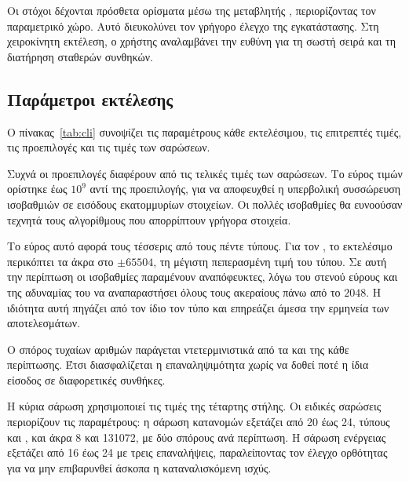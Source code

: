 Οι στόχοι δέχονται πρόσθετα ορίσματα μέσω της μεταβλητής ,
περιορίζοντας τον παραμετρικό χώρο. Αυτό διευκολύνει τον γρήγορο έλεγχο της
εγκατάστασης. Στη χειροκίνητη εκτέλεση, ο χρήστης αναλαμβάνει την ευθύνη για τη
σωστή σειρά και τη διατήρηση σταθερών συνθηκών.

\subsection{Παράμετροι εκτέλεσης}
\label{sec:repro-cli}

Ο πίνακας~\ref{tab:cli} συνοψίζει τις παραμέτρους κάθε εκτελέσιμου, τις
επιτρεπτές τιμές, τις προεπιλογές και τις τιμές των σαρώσεων.

Συχνά οι προεπιλογές διαφέρουν από τις τελικές τιμές των σαρώσεων. Το εύρος
τιμών ορίστηκε έως $10^9$ αντί της προεπιλογής, για να αποφευχθεί η υπερβολική
συσσώρευση ισοβαθμιών σε εισόδους εκατομμυρίων στοιχείων. Οι πολλές ισοβαθμίες
θα ευνοούσαν τεχνητά τους αλγορίθμους που απορρίπτουν γρήγορα στοιχεία.

Το εύρος αυτό αφορά τους τέσσερις από τους πέντε τύπους. Για τον , το
εκτελέσιμο περικόπτει τα άκρα στο $\pm 65504$, τη μέγιστη πεπερασμένη τιμή του
τύπου. Σε αυτή την περίπτωση οι ισοβαθμίες παραμένουν αναπόφευκτες, λόγω του
στενού εύρους και της αδυναμίας του  να αναπαραστήσει όλους τους
ακεραίους πάνω από το $2048$. Η ιδιότητα αυτή πηγάζει από τον ίδιο τον τύπο και
επηρεάζει άμεσα την ερμηνεία των αποτελεσμάτων.

Ο σπόρος τυχαίων αριθμών παράγεται ντετερμινιστικά από τα  και  της
κάθε περίπτωσης. Έτσι διασφαλίζεται η επαναληψιμότητα χωρίς να δοθεί ποτέ η
ίδια είσοδος σε διαφορετικές συνθήκες.

Η κύρια σάρωση χρησιμοποιεί τις τιμές της τέταρτης στήλης. Οι ειδικές σαρώσεις
περιορίζουν τις παραμέτρους: η σάρωση κατανομών εξετάζει  από 20 έως 24,
τύπους  και , και άκρα  8 και 131072, με δύο σπόρους
ανά περίπτωση. Η σάρωση ενέργειας εξετάζει  από 16 έως 24 με τρεις
επαναλήψεις, παραλείποντας τον έλεγχο ορθότητας για να μην επιβαρυνθεί άσκοπα η
καταναλισκόμενη ισχύς.

